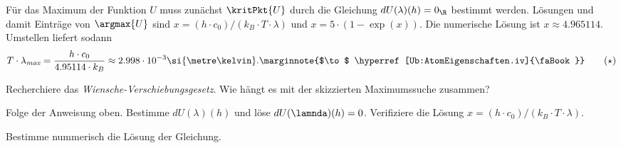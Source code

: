\documentclass{article}
\begin{document}
    Für das Maximum der Funktion $U$ muss zunächst $\kritPkt{U}$ durch die Gleichung $dU(\lambda)(h) = 0_\R$ bestimmt werden. Lösungen und damit Einträge von $\argmax{U}$ sind $x=(h\cdot c_0)/(k_B\cdot T\cdot\lambda)$ und $x = 5\cdot (1-\exp(x))$. Die numerische Lösung ist $x\approx 4.965114$. Umstellen liefert sodann 
    \begin{align*}
        T\cdot\lambda_\textit{max} = \frac{h\cdot c_0}{4.95114\cdot k_B}\approx 2.998\cdot 10^{-3}\si{\metre\kelvin}.\label{eq:WienscheVerschiebungsgesetz}\marginnote{$\to$ \hyperref[Ub:AtomEigenschaften.iv]{\faBook}}\tag{$\star$}
    \end{align*}

    \begin{Aufgabe}
        \nr{} Recherchiere das \emph{Wiensche-Verschiebungsgesetz}. Wie hängt es mit der skizzierten Maximumssuche zusammen?

        \nr{} Folge der Anweisung oben. Bestimme $dU(\lambda)(h)$ und löse $dU(\lamnda)(h) = 0$. Verifiziere die Lösung $x=(h\cdot c_0)/(k_B\cdot T\cdot\lambda)$. 

        \nr{} Bestimme nummerisch die Lösung der Gleichung. 
    \end{Aufgabe}
\end{document}
